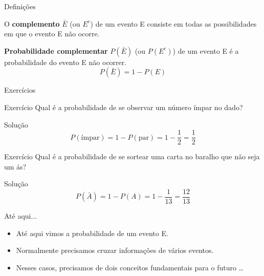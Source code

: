 \documentclass{beamer}
\begin{document}
\begin{frame}{Definições}
  \begin{definition}
    O {\bf complemento} $\bar{E}$ (ou $E^c$) de um evento E consiste
    em todas as possibilidades em que o evento E \alert{não} ocorre.
  \end{definition}
  \begin{definition}
    {\bf Probabilidade complementar} $P(\bar{E})$ (ou $P(E^c)$) de um
    evento E é a probabilidade do evento E \alert{não} ocorrer.
    \begin{displaymath}
      P(\bar{E}) = 1 - P(E)
    \end{displaymath}
  \end{definition}
\end{frame}

\begin{frame}{Exercícios}
  \begin{block}{Exercício}
    Qual é a probabilidade de se observar um número ímpar no dado?
  \end{block}
  \begin{block}{Solução}
    \begin{displaymath}
      P(\text{ímpar}) = 1-P(\text{par}) = 1-\frac{1}{2} = \frac{1}{2}
    \end{displaymath}
  \end{block}
  \begin{block}{Exercício}
    Qual é a probabilidade de se sortear uma carta no baralho que não
    seja um ás?
  \end{block}
  \begin{block}{Solução}
    \begin{displaymath}
      P(\bar{A})   = 1 - P(A) = 1- \frac{1}{13} = \frac{12}{13}
    \end{displaymath}
  \end{block}
\end{frame}

\begin{frame}{Até aqui...}
  \begin{itemize}
  \item Até aqui vimos a probabilidade de \alert{um} evento E.
  \item Normalmente precisamos cruzar informações de \alert{vários} eventos.
  \item Nesses casos, precisamos de dois conceitos fundamentais para o futuro \ldots
  \end{itemize}
\end{frame}
\end{document}
